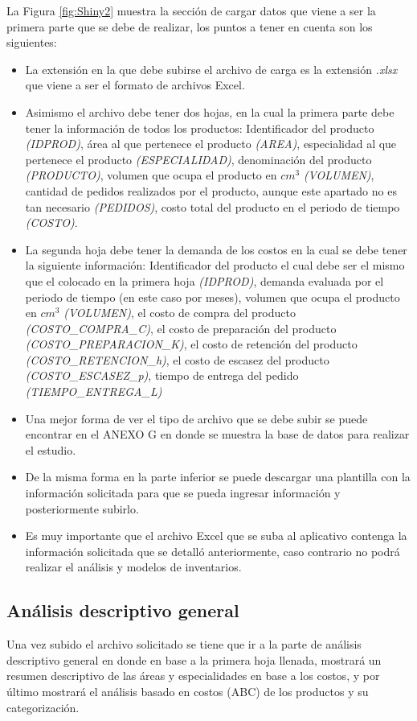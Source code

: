 La Figura \ref{fig:Shiny2} muestra la sección de cargar datos que viene a ser la primera parte que se debe de realizar, los puntos a tener en cuenta son los siguientes:

\begin{itemize}
  \item La extensión en la que debe subirse el archivo de carga es la extensión \textsl{.xlsx} que viene a ser el formato de archivos Excel.
  \item Asimismo el archivo debe tener dos hojas, en la cual la primera parte debe tener la información de todos los productos: Identificador del producto \textsl{(IDPROD)}, área al que pertenece el producto \textsl{(AREA)}, especialidad al que pertenece el producto \textsl{(ESPECIALIDAD)}, denominación del producto \textsl{(PRODUCTO)}, volumen que ocupa el producto en $cm^3$ \textsl{(VOLUMEN)}, cantidad de pedidos realizados por el producto, aunque este apartado no es tan necesario \textsl{(PEDIDOS)}, costo total del producto en el periodo de tiempo \textsl{(COSTO)}.
  \item La segunda hoja debe tener la demanda de los costos en la cual se debe tener la siguiente información: Identificador del producto el cual debe ser el mismo que el colocado en la primera hoja \textsl{(IDPROD)}, demanda evaluada por el periodo de tiempo (en este caso por meses), volumen que ocupa el producto en $cm^3$ \textsl{(VOLUMEN)}, el costo de compra del producto \textsl{(COSTO\_COMPRA\_C)}, el costo de preparación del producto \textsl{(COSTO\_PREPARACION\_K)}, el costo de retención del producto \textsl{(COSTO\_RETENCION\_h)}, el costo de escasez del producto \textsl{(COSTO\_ESCASEZ\_p)}, tiempo de entrega del pedido \textsl{(TIEMPO\_ENTREGA\_L)}
  \item Una mejor forma de ver el tipo de archivo que se debe subir se puede encontrar en el ANEXO G en donde se muestra la base de datos para realizar el estudio.
  \item De la misma forma en la parte inferior se puede descargar una plantilla con la información solicitada para que se pueda ingresar información y posteriormente subirlo.
  \item Es muy importante que el archivo Excel que se suba al aplicativo contenga la información solicitada que se detalló anteriormente, caso contrario no podrá realizar el análisis y modelos de inventarios.
\end{itemize}

\subsection{Análisis descriptivo general}
Una vez subido el archivo solicitado se tiene que ir a la parte de análisis descriptivo general en donde en base a la primera hoja llenada, mostrará un resumen descriptivo de las áreas y especialidades en base a los costos, y por último mostrará el análisis basado en costos (ABC) de los productos y su categorización.

